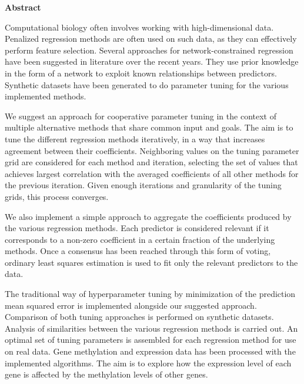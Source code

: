\newpage
{\Huge \bf Abstract}
\vspace{24pt} 

Computational biology often involves working with high-dimensional data. Penalized regression methods are often used on such data, as they can effectively perform feature selection. Several approaches for network-constrained regression have been suggested in literature over the recent years. They use prior knowledge in the form of a network to exploit known relationships between predictors. Synthetic datasets have been generated to do parameter tuning for the various implemented methods. 

We suggest an approach for cooperative parameter tuning in the context of multiple alternative methods that share common input and goals. The aim is to tune the different regression methods iteratively, in a way that increases agreement between their coefficients. Neighboring values on the tuning parameter grid are considered for each method and iteration, selecting the set of values that achieves largest correlation with the averaged coefficients of all other methods for the previous iteration. Given enough iterations and granularity of the tuning grids, this process converges.

We also implement a simple approach to aggregate the coefficients produced by the various regression methods. Each predictor is considered relevant if it corresponds to a non-zero coefficient in a certain fraction of the underlying methods. Once a consensus has been reached through this form of voting, ordinary least squares estimation is used to fit only the relevant predictors to the data.

The traditional way of hyperparameter tuning by minimization of the prediction mean squared error is implemented alongside our suggested approach. Comparison of both tuning approaches is performed on synthetic datasets. Analysis of similarities between the various regression methods is carried out. An optimal set of tuning parameters is assembled for each regression method for use on real data. Gene methylation and expression data has been processed with the implemented algorithms. The aim is to explore how the expression level of each gene is affected by the methylation levels of other genes.

\newpage
\vspace*{\fill}
